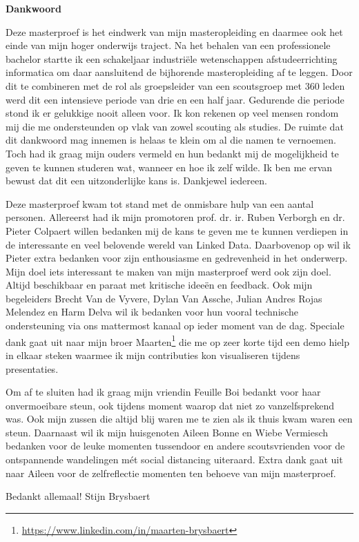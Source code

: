 \thispagestyle{empty}    %

\begin{center}
\textbf{Dankwoord}
\end{center}

Deze masterproef is het eindwerk van mijn masteropleiding en daarmee ook het einde van mijn hoger onderwijs traject. Na het behalen van een professionele bachelor startte ik een schakeljaar industriële wetenschappen afstudeerrichting informatica om daar aansluitend de bijhorende masteropleiding af te leggen. Door dit te combineren met de rol als groepsleider van een scoutsgroep met 360 leden werd dit een intensieve periode van drie en een half jaar. Gedurende die periode stond ik er gelukkige nooit alleen voor. Ik kon rekenen op veel mensen rondom mij die me ondersteunden op vlak van zowel scouting als studies. De ruimte dat dit dankwoord mag innemen is helaas te klein om al die namen te vernoemen. Toch had ik graag mijn ouders vermeld en hun bedankt mij de mogelijkheid te geven te kunnen studeren wat, wanneer en hoe ik zelf wilde. Ik ben me ervan bewust dat dit een uitzonderlijke kans is. Dankjewel iedereen.

Deze masterproef kwam tot stand met de onmisbare hulp van een aantal personen. Allereerst had ik mijn promotoren prof. dr. ir. Ruben Verborgh en dr. Pieter Colpaert willen bedanken mij de kans te geven me te kunnen verdiepen in de interessante en veel belovende wereld van Linked Data. Daarbovenop op wil ik Pieter extra bedanken voor zijn enthousiasme en gedrevenheid in het onderwerp. Mijn doel iets interessant te maken van mijn masterproef werd ook zijn doel. Altijd beschikbaar en paraat met kritische ideeën en feedback. Ook mijn begeleiders Brecht Van de Vyvere, Dylan Van Assche, Julian Andres Rojas Melendez en Harm Delva wil ik bedanken voor hun vooral technische ondersteuning via ons mattermost kanaal op ieder moment van de dag. Speciale dank gaat uit naar mijn broer Maarten\footnote{\url{https://www.linkedin.com/in/maarten-brysbaert}} die me op zeer korte tijd een demo hielp in elkaar steken waarmee ik mijn contributies kon visualiseren tijdens presentaties.

Om af te sluiten had ik graag mijn vriendin Feuille Boi bedankt voor haar onvermoeibare steun, ook tijdens moment waarop dat niet zo vanzelfsprekend was. Ook mijn zussen die altijd blij waren me te zien als ik thuis kwam waren een steun. Daarnaast wil ik mijn huisgenoten Aileen Bonne en Wiebe Vermiesch bedanken voor de leuke momenten tussendoor en andere scoutsvrienden voor de ontspannende wandelingen mét social distancing uiteraard. Extra dank gaat uit naar Aileen voor de zelfreflectie momenten ten behoeve van mijn masterproef.

Bedankt allemaal!
\newline
Stijn Brysbaert